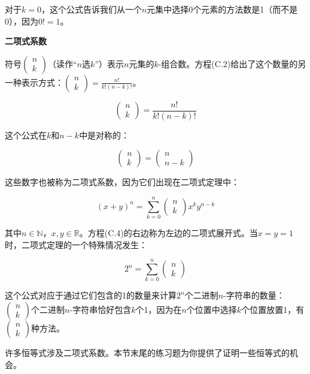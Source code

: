 \documentclass[lang=cn,newtx,10pt,scheme=chinese]{elegantbook}
\begin{document}
对于$k=0$，这个公式告诉我们从一个$n$元集中选择0个元素的方法数是1（而不是0），因为$0 !=1$。

\textbf{二项式系数}

符号$(\begin{array}{l}n \\ k\end{array})$（读作“$n$选$k$”）表示$n$元集的$k$-组合数。方程(C.2)给出了这个数量的另一种表示方式：$(\begin{array}{l}n \\ k\end{array})=\frac{n !}{k !(n-k) !}$。

$$
(\begin{array}{l}
n \\
k
\end{array})=\frac{n !}{k !(n-k) !}
$$

这个公式在$k$和$n-k$中是对称的：

$$
(\begin{array}{l}
n \\
k
\end{array})=(\begin{array}{c}
n \\
n-k
\end{array})
$$

这些数字也被称为二项式系数，因为它们出现在二项式定理中：

$$
(x+y)^n=\sum_{k=0}^n(\begin{array}{l}
n \\
k
\end{array}) x^k y^{n-k}
$$

其中$n \in \mathbb{N}$，$x, y \in \mathbb{R}$。方程(C.4)的右边称为左边的二项式展开式。当$x=y=1$时，二项式定理的一个特殊情况发生：

$$
2^n=\sum_{k=0}^n(\begin{array}{l}
n \\
k
\end{array})
$$

这个公式对应于通过它们包含的1的数量来计算$2^n$个二进制$n$-字符串的数量：$(\begin{array}{l}n \\ k\end{array})$个二进制$n$-字符串恰好包含$k$个1，因为在$n$个位置中选择$k$个位置放置1，有$(\begin{array}{l}n \\ k\end{array})$种方法。

许多恒等式涉及二项式系数。本节末尾的练习题为你提供了证明一些恒等式的机会。
\end{document}
